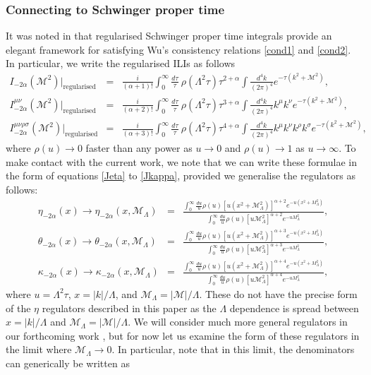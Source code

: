 \documentclass[11pt, letter]{article}
\newcommand{\M}{\mathcal{M}}
\begin{document}
\subsubsection{Connecting to Schwinger proper time} \label{sec:SPT}
It was noted in \cite{Xing:2022jtt} that regularised Schwinger proper time integrals  provide an elegant framework for satisfying Wu's consistency relations \eqref{cond1} and \eqref{cond2}.  In particular, we write the regularised ILIs as follows
\begin{eqnarray}
I_{-2\alpha} (\M^2)|_\text{regularised}&=& \frac{i}{(\alpha+1)!} \int_0^\infty \frac{d\tau}{\tau} \ \rho(\Lambda^2 \tau)  \tau^{2 + \alpha} \int \frac{d^4 k}{(2 \pi)^4}  e^{-\tau (k^2+\M^2)}, \label{ILIs1ST} \\ 
I_{-2 \alpha}^{ \mu \nu} (\M^2) |_\text{regularised}&=& \frac{i}{(\alpha+2)!} \int_0^\infty \frac{d\tau}{\tau} \ \rho(\Lambda^2 \tau)  \tau^{3 + \alpha} \int \frac{d^4 k}{(2 \pi)^4}  k^\mu k^\nu e^{-\tau (k^2+\M^2)}, \label{ILIs2ST} \\ 
I_{-2 \alpha}^{\mu \nu \rho \sigma} (\M^2) |_\text{regularised}&=&  \frac{i}{(\alpha+3)!} \int_0^\infty \frac{d\tau}{\tau} \ \rho(\Lambda^2 \tau)  \tau^{4 + \alpha} \int \frac{d^4 k}{(2 \pi)^4}  k^{\mu}k^{\nu}k^{\rho}k^{\sigma} e^{-\tau (k^2+\M^2)},\quad
 \label{ILIs3ST}
\end{eqnarray}
where  $\rho(u) \to 0$ faster than any power as $u\to 0$ and $\rho(u) \to 1$ as $u \to \infty$. To make contact with the current work, we note that we can write these formulae in the form of equations \eqref{Jeta} to \eqref{Jkappa}, provided we generalise the regulators as follows:
\begin{eqnarray}
\eta_{-2\alpha}(x) \to \eta_{-2\alpha}(x, \M_\Lambda)&=&\frac{\int_0^\infty \frac{du}{u} \rho(u) [u(x^2+\M_\Lambda^2)]^{\alpha+2} e^{-u(x^2+M_\Lambda^2)}}{\int_0^\infty\frac{du}{u} \rho(u) [u\M_\Lambda^2]^{\alpha+2} e^{-u M_\Lambda^2}}, \\
\theta_{-2\alpha}(x) \to \theta_{-2\alpha}(x, \M_\Lambda)&=&\frac{\int_0^\infty \frac{du}{u} \rho(u) [u(x^2+\M_\Lambda^2)]^{\alpha+3} e^{-u(x^2+M_\Lambda^2)}}{\int_0^\infty \frac{du}{u} \rho(u) [u\M_\Lambda^2]^{\alpha+3} e^{-u M_\Lambda^2}}, \\
\kappa_{-2\alpha}(x) \to \kappa_{-2\alpha}(x, \M_\Lambda)&=&\frac{\int_0^\infty \frac{du}{u} \rho(u) [u(x^2+\M_\Lambda^2)]^{\alpha+4} e^{-u(x^2+M_\Lambda^2)}}{\int_0^\infty  \frac{du}{u} \rho(u) [u\M_\Lambda^2]^{\alpha+4} e^{-u M_\Lambda^2}},
\end{eqnarray} 
where $u=\Lambda^2 \tau$,  $x=|k|/\Lambda$, and $\M_\Lambda=|\M|/\Lambda$.  These do not have the precise form of the $\eta$ regulators described in this paper as the $\Lambda$ dependence is spread between  $x=|k|/\Lambda$ and $\M_\Lambda=|\M|/\Lambda$. We will consider much more general regulators in our forthcoming work \cite{PadillaSmith23}, but for now let us examine the form of these regulators in the limit where $\M_\Lambda \to 0$.   In particular, note that in this limit, the denominators can generically be written as 
\end{document}
